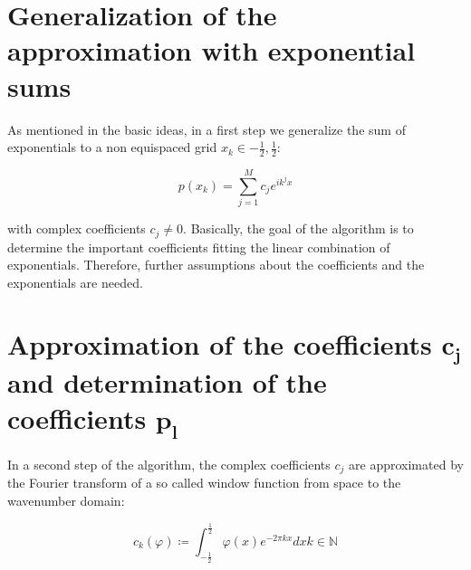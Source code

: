 \documentclass[11pt]{report} %
\begin{document}
\section{Generalization of the approximation with exponential sums}
As mentioned in the basic ideas, in a first step we generalize the sum of exponentials to a non equispaced grid $x_k \in{-\frac{1}{2},\frac{1}{2}}$:

\begin{equation} \label{eqn: nonequi exp}
 p(x_k)=\sum\limits_{j=1}^M c_{j}e^{ik^{j}x}
\end{equation}

with complex coefficients $c_{j} \neq 0$.
Basically, the goal of the algorithm is to determine the important coefficients fitting the linear combination of exponentials.
Therefore, further assumptions about the coefficients and the exponentials are needed.  

\section{Approximation of the coefficients $\bm{c_j}$ and determination of the coefficients $\bm{p_l}$}
In a second step of the algorithm, the complex coefficients $c_j$ are approximated by the Fourier transform of a so called window function from space to the wavenumber domain: 

\begin{equation}
c_{k} (\varphi) \coloneqq \int_{-\frac{1}{2}}^{\frac{1}{2}} \varphi (x) e^{-2 \pi kx} dx         
k \in \mathbb{N}
\end{equation}
\end{document}
